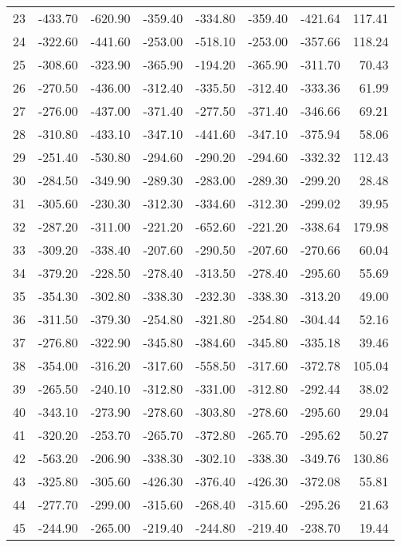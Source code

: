 \begin{longtable}{rrrrrrrr}
23 & -433.70 & -620.90 & -359.40 & -334.80 & -359.40 & -421.64 & 117.41  \\
24 & -322.60 & -441.60 & -253.00 & -518.10 & -253.00 & -357.66 & 118.24  \\
25 & -308.60 & -323.90 & -365.90 & -194.20 & -365.90 & -311.70 & 70.43  \\
26 & -270.50 & -436.00 & -312.40 & -335.50 & -312.40 & -333.36 & 61.99  \\
27 & -276.00 & -437.00 & -371.40 & -277.50 & -371.40 & -346.66 & 69.21  \\
28 & -310.80 & -433.10 & -347.10 & -441.60 & -347.10 & -375.94 & 58.06  \\
29 & -251.40 & -530.80 & -294.60 & -290.20 & -294.60 & -332.32 & 112.43  \\
30 & -284.50 & -349.90 & -289.30 & -283.00 & -289.30 & -299.20 & 28.48  \\
31 & -305.60 & -230.30 & -312.30 & -334.60 & -312.30 & -299.02 & 39.95  \\
32 & -287.20 & -311.00 & -221.20 & -652.60 & -221.20 & -338.64 & 179.98  \\
33 & -309.20 & -338.40 & -207.60 & -290.50 & -207.60 & -270.66 & 60.04  \\
34 & -379.20 & -228.50 & -278.40 & -313.50 & -278.40 & -295.60 & 55.69  \\
35 & -354.30 & -302.80 & -338.30 & -232.30 & -338.30 & -313.20 & 49.00  \\
36 & -311.50 & -379.30 & -254.80 & -321.80 & -254.80 & -304.44 & 52.16  \\
37 & -276.80 & -322.90 & -345.80 & -384.60 & -345.80 & -335.18 & 39.46  \\
38 & -354.00 & -316.20 & -317.60 & -558.50 & -317.60 & -372.78 & 105.04  \\
39 & -265.50 & -240.10 & -312.80 & -331.00 & -312.80 & -292.44 & 38.02  \\
40 & -343.10 & -273.90 & -278.60 & -303.80 & -278.60 & -295.60 & 29.04  \\
41 & -320.20 & -253.70 & -265.70 & -372.80 & -265.70 & -295.62 & 50.27  \\
42 & -563.20 & -206.90 & -338.30 & -302.10 & -338.30 & -349.76 & 130.86  \\
43 & -325.80 & -305.60 & -426.30 & -376.40 & -426.30 & -372.08 & 55.81  \\
44 & -277.70 & -299.00 & -315.60 & -268.40 & -315.60 & -295.26 & 21.63  \\
45 & -244.90 & -265.00 & -219.40 & -244.80 & -219.40 & -238.70 & 19.44  \\

\end{longtable}
